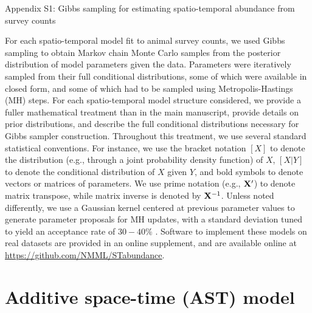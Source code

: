 \documentclass[12pt,fleqn]{article}
\begin{document}
\rm \begin{flushleft}

\raggedbottom
\vspace{.5in}

\begin{center}
Appendix S1: Gibbs sampling for estimating spatio-temporal abundance from survey counts
\bigskip
\end{center}
\vspace{.3in}

\doublespacing
For each spatio-temporal model fit to animal survey counts, we used Gibbs sampling \citep[see e.g.,][]{GelmanEtAl2004} to obtain Markov chain Monte Carlo samples from the posterior distribution of model parameters given the data.  Parameters were iteratively sampled from their full conditional distributions, some of
which were available in closed form, and some of which had to be sampled using Metropolis-Hastings (MH) steps.  For each spatio-temporal model structure considered, we provide a fuller mathematical treatment than in the main manuscript, provide details on prior distributions, and describe the full conditional distributions necessary for Gibbs sampler construction.  Throughout this treatment, we use several standard statistical conventions.  For instance, we use the bracket notation $[X]$ to denote the distribution (e.g., through a joint probability density function) of $X$, $[X|Y]$ to denote the conditional distribution of $X$ given $Y$, and bold symbols to denote vectors or matrices of parameters. We use prime notation (e.g., ${\bf X}^\prime$) to denote matrix transpose, while matrix inverse is denoted by ${\bf X}^{-1}$. Unless noted differently, we use a Gaussian kernel centered at previous parameter values to generate parameter proposals for MH updates, with a standard deviation tuned to yield an acceptance rate of $30-40\%$ \citep{GelmanEtAl2004}.  Software to implement these models on real datasets are provided in an online supplement, and are available online at \url{https://github.com/NMML/STabundance}.

\section{Additive space-time (AST) model}


\end{flushleft}
\end{document}
